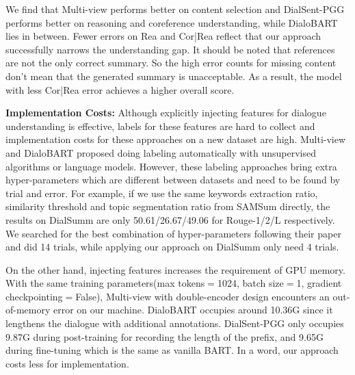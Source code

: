 We find that Multi-view performs better on content selection and DialSent-PGG performs better on reasoning and coreference understanding, while DialoBART lies in between. 
Fewer errors on Rea and Cor|Rea reflect that our approach successfully narrows the understanding gap.
It should be noted that references are not the only correct summary. So the high error counts for missing content don't mean that the generated summary is unacceptable. As a result, the model with less Cor|Rea error achieves a higher overall score.




\textbf{Implementation Costs:} 
Although explicitly injecting features for dialogue understanding is effective, labels for these features are hard to collect and implementation costs for these approaches on a new dataset are high. 
Multi-view and DialoBART proposed doing labeling automatically with unsupervised algorithms or language models. However, these labeling approaches bring extra hyper-parameters which are different between datasets and need to be found by trial and error. For example, if we use the same keywords extraction ratio, similarity threshold and topic segmentation ratio from SAMSum directly, the results on DialSumm are only 50.61/26.67/49.06 for Rouge-1/2/L respectively. We searched for the best combination of hyper-parameters following their paper and did 14 trials, while applying our approach on DialSumm only need 4 trials.

On the other hand, injecting features increases the requirement of GPU memory. With the same training parameters(max tokens$=$1024, batch size$=$1, gradient checkpointing$=$False), Multi-view with double-encoder design encounters an out-of-memory error on our machine. DialoBART occupies around 10.36G since it lengthens the dialogue with additional annotations. DialSent-PGG only occupies 9.87G during post-training for recording the length of the prefix, and 9.65G during fine-tuning which is the same as vanilla BART.  
In a word, our approach costs less for implementation.


